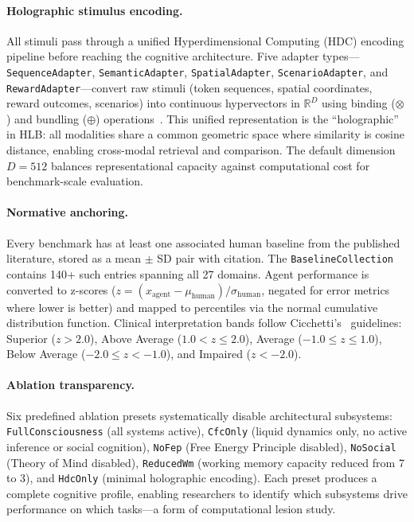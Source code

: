 \documentclass[11pt,letterpaper]{article}
\newcommand{\bind}{\otimes}
\newcommand{\bundle}{\oplus}
\newcommand{\hlb}{\textsc{HLB}}
\begin{document}
\paragraph{Holographic stimulus encoding.} All stimuli pass through a unified Hyperdimensional Computing (HDC) encoding pipeline before reaching the cognitive architecture. Five adapter types---\texttt{SequenceAdapter}, \texttt{SemanticAdapter}, \texttt{SpatialAdapter}, \texttt{ScenarioAdapter}, and \texttt{RewardAdapter}---convert raw stimuli (token sequences, spatial coordinates, reward outcomes, scenarios) into continuous hypervectors in $\mathbb{R}^D$ using binding ($\bind$) and bundling ($\bundle$) operations~\citep{kleyko2023survey}. This unified representation is the ``holographic'' in \hlb{}: all modalities share a common geometric space where similarity is cosine distance, enabling cross-modal retrieval and comparison. The default dimension $D = 512$ balances representational capacity against computational cost for benchmark-scale evaluation.

\paragraph{Normative anchoring.} Every benchmark has at least one associated human baseline from the published literature, stored as a mean $\pm$ SD pair with citation. The \texttt{BaselineCollection} contains 140+ such entries spanning all 27 domains. Agent performance is converted to z-scores ($z = (x_{\text{agent}} - \mu_{\text{human}}) / \sigma_{\text{human}}$, negated for error metrics where lower is better) and mapped to percentiles via the normal cumulative distribution function. Clinical interpretation bands follow Cicchetti's~\citep{cicchetti1994guidelines} guidelines: Superior ($z > 2.0$), Above Average ($1.0 < z \leq 2.0$), Average ($-1.0 \leq z \leq 1.0$), Below Average ($-2.0 \leq z < -1.0$), and Impaired ($z < -2.0$).

\paragraph{Ablation transparency.} Six predefined ablation presets systematically disable architectural subsystems: \texttt{FullConsciousness} (all systems active), \texttt{CfcOnly} (liquid dynamics only, no active inference or social cognition), \texttt{NoFep} (Free Energy Principle disabled), \texttt{NoSocial} (Theory of Mind disabled), \texttt{ReducedWm} (working memory capacity reduced from 7 to 3), and \texttt{HdcOnly} (minimal holographic encoding). Each preset produces a complete cognitive profile, enabling researchers to identify which subsystems drive performance on which tasks---a form of computational lesion study.
\end{document}
